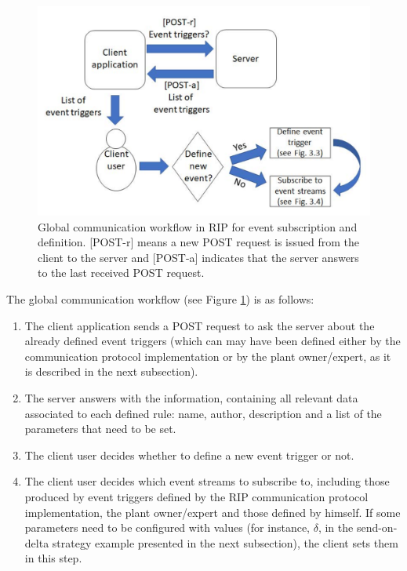 \begin{figure}[b!]
\begin{center}
\centering
\includegraphics[width=0.8\columnwidth]{images/workflow_global.pdf}
\caption{Global communication workflow in RIP for event subscription and definition. [POST-r] means a new POST request is issued from the client to the server and [POST-a] indicates that the server answers to the last received POST request.}
\label{fig:global_workflow}
\end{center}
\end{figure}

The global communication workflow (see Figure \ref{fig:global_workflow}) is as follows:

\begin{enumerate}
	\item The client application sends a POST request to ask the server about the already defined event triggers (which can may have been defined either by the communication protocol implementation or by the plant owner/expert, as it is described in the next subsection). 
	\item The server answers with the information, containing all relevant data associated to each defined rule: name, author, description and a list of the parameters that need to be set. 
	\item The client user decides whether to define a new event trigger or not.
	\item The client user decides which event streams to subscribe to, including those produced by event triggers defined by the RIP communication protocol implementation, the plant owner/expert and those defined by himself. If some parameters need to be configured with values (for instance, $\delta$, in the send-on-delta strategy example presented in the next subsection), the client sets them in this step.
\end{enumerate}

